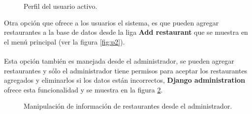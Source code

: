 \documentclass[12pt,letterpaper,oneside] {memoir}
\begin{document}
\begin{figure}[H]
\centering 
{} \caption{Perfil del usuario activo.} 
\label{fig:p6} 
\end{figure}

Otra opción que ofrece a los usuarios el sistema, es que pueden agregar restaurantes a la base de datos desde la liga \textbf{Add restaurant}  que se muestra en el menú principal (ver la figura \ref{fig:p2}).
\paragraph{}
Esta opción también es manejada desde el administrador, se pueden agregar restaurantes y sólo el administrador tiene permisos para aceptar los restaurantes agregados y eliminarlos si los datos están incorrectos, \textbf{Django administration} ofrece esta funcionalidad y se muestra en la figura \ref{fig:p7}.

\begin{figure}[H]
\centering 
{} \caption{Manipulación de información de restaurantes desde el administrador.} 
\label{fig:p7} 
\end{figure}
\end{document}
